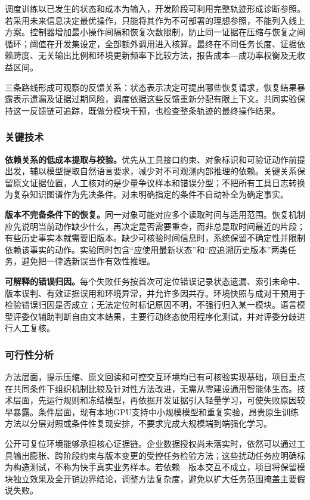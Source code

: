 调度训练以已发生的状态和成本为输入，开发阶段可利用完整轨迹形成诊断参照。若采用未来信息决定最优操作，只能将其作为不可部署的理想参照，不能列入线上方案。控制器增加最小操作间隔和恢复次数限制，防止同一证据在压缩与恢复之间循环；阈值在开发集设定，全部额外调用进入核算。最终在不同任务长度、证据依赖跨度、无关输出比例和环境更新频率下比较方法，报告成本—成功率权衡及无收益区间。

三条路线形成可观察的反馈关系：状态表示决定可提出哪些恢复请求，恢复结果暴露表示遗漏及证据过期风险，调度依据这些反馈重新分配有限上下文。共同实验保持这一反馈链可追踪，既做分模块干预，也检查整条轨迹的最终操作结果。

\subsubsection{关键技术}
\textbf{依赖关系的低成本提取与校验。}优先从工具接口约束、对象标识和可验证动作前提出发，辅以模型提取自然语言要求，减少对不可观测内部推理的依赖。关键关系保留原文证据位置，人工核对的是少量争议样本和错误分型；不把所有工具日志转换为复杂知识图谱作为先决条件。对未明确指定的条件不自动补全为确定事实。

\textbf{版本不完备条件下的恢复。}同一对象可能对应多个读取时间与适用范围。恢复机制应先说明当前动作缺少什么，再决定是否需要重查，而非总是取时间最近的片段；有些历史事实本就需要旧版本。缺少可核验时间信息时，系统保留不确定性并限制依赖该事实的动作。实验同时包含“应使用最新状态”和“应追溯历史版本”两类任务，避免把一律选新误当作有效性推理。

\textbf{可解释的错误归因。}每个失败任务按首次可定位错误记录状态遗漏、索引未命中、版本误判、有效证据误用和环境异常，并允许多因共存。环境快照与成对干预用于检验错误归因是否成立；无法定位时标记原因不明，不强行归入某一模块。语言模型评委仅辅助判断自由文本结果，主要行动终态使用程序化测试，并对评委分歧进行人工复核。

\subsubsection{可行性分析}
方法层面，提示压缩、原文回读和可控交互环境均已有可核验实现基础，项目重点在共同条件下组织机制比较及针对性方法改进，无需从零建设通用智能体生态。技术层面，先运行规则和冻结模型，再依据开发证据引入轻量学习，可使失败原因较早暴露。条件层面，现有本地GPU支持中小规模模型和重复实验，昂贵原生训练方法以分层对照或条件性复现安排，不要求完成大规模端到端强化学习。

公开可复位环境能够承担核心证据链。企业数据授权尚未落实时，依然可以通过工具输出膨胀、跨阶段约束与版本变更的受控任务检验方法；这些扰动任务应明确标为构造测试，不称为快手真实业务样本。若依赖—版本交互不成立，项目将保留模块独立效果及全开销边界结论，调整方法复杂度，避免以扩大任务范围掩盖主要假说失败。
